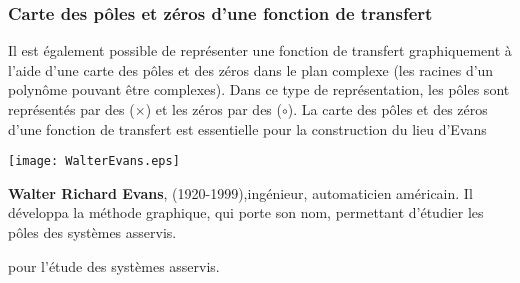 \subsubsection{Carte des pôles et zéros d'une fonction de transfert}
Il est également possible de représenter une fonction de transfert 
graphiquement à l'aide d'une carte des pôles et des zéros dans le plan complexe 
(les racines d'un polynôme pouvant être complexes). Dans ce type 
de représentation, les pôles sont représentés par des ($\times$) 
et les zéros par des ($\circ$). La carte des pôles et des zéros 
d'une fonction de transfert est essentielle pour la construction du 
lieu d'Evans
\begin{marginfigure}
    \centering
    \texttt{[image: WalterEvans.eps]} 
    \caption*{\textbf{Walter Richard Evans}, (1920-1999),ingénieur, 
              automaticien américain. Il développa la méthode graphique, 
              qui porte son nom, permettant d'étudier les pôles des 
              systèmes asservis.}
\end{marginfigure}
pour l'étude des systèmes asservis.

